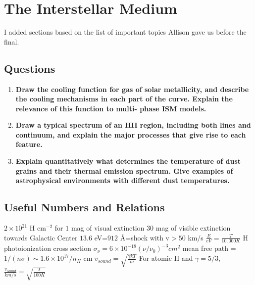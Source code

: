 \section{The Interstellar Medium}

I added sections based on the list of important topics Allison gave us 
before the final. 

\subsection{Questions}
\begin{enumerate}
\item \textbf{Draw the cooling function for gas of solar metallicity, and describe the cooling
      mechanisms in each part of the curve. Explain the relevance of this function to multi-
      phase ISM models.}
\item \textbf{Draw a typical spectrum of an HII region, including both lines and continuum, and
      explain the major processes that give rise to each feature.}
\item \textbf{Explain quantitatively what determines the temperature of dust grains and their
      thermal emission spectrum. Give examples of astrophysical environments with different
      dust temperatures.}
\end{enumerate}

\subsection{Useful Numbers and Relations}
$2\times10^{21}$ H cm$^{-2}$ for $1$ mag of visual extinction\newline
\newline
$30$ mag of visible extinction towards Galactic Center\newline
\newline
$13.6$ eV=$912$ \AA=shock with v$>50$ km/s\newline
\newline
$\frac{E}{eV}=\frac{T}{10,000 K}$\newline
\newline
H photoionization cross section $\sigma_{\nu}=6\times10^{-18}(\nu/\nu_0)^{-3}
cm^2$\newline
\newline
mean free path = $1/(n\sigma)\sim 1.6\times10^{17}/n_H$ cm\newline
\newline
$v_{sound}=\sqrt{\frac{\gamma kT}{m}}$\newline
\newline
For atomic H and $\gamma=5/3$,\newline
\newline
$\frac{v_{sound}}{km/s}=\sqrt{\frac{T}{100 K}}$


